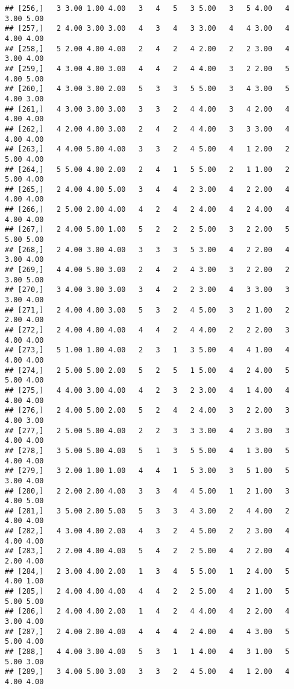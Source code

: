 \documentclass[]{article}
\begin{document}
\begin{verbatim}
## [256,]   3 3.00 1.00 4.00   3   4   5   3 5.00   3   5 4.00   4 3.00 5.00
## [257,]   2 4.00 3.00 3.00   4   3   4   3 3.00   4   4 3.00   4 4.00 4.00
## [258,]   5 2.00 4.00 4.00   2   4   2   4 2.00   2   2 3.00   4 3.00 4.00
## [259,]   4 3.00 4.00 3.00   4   4   2   4 4.00   3   2 2.00   5 4.00 5.00
## [260,]   4 3.00 3.00 2.00   5   3   3   5 5.00   3   4 3.00   5 4.00 3.00
## [261,]   4 3.00 3.00 3.00   3   3   2   4 4.00   3   4 2.00   4 4.00 4.00
## [262,]   4 2.00 4.00 3.00   2   4   2   4 4.00   3   3 3.00   4 4.00 4.00
## [263,]   4 4.00 5.00 4.00   3   3   2   4 5.00   4   1 2.00   2 5.00 4.00
## [264,]   5 5.00 4.00 2.00   2   4   1   5 5.00   2   1 1.00   2 5.00 4.00
## [265,]   2 4.00 4.00 5.00   3   4   4   2 3.00   4   2 2.00   4 4.00 4.00
## [266,]   2 5.00 2.00 4.00   4   2   4   2 4.00   4   2 4.00   4 4.00 4.00
## [267,]   2 4.00 5.00 1.00   5   2   2   2 5.00   3   2 2.00   5 5.00 5.00
## [268,]   2 4.00 3.00 4.00   3   3   3   5 3.00   4   2 2.00   4 3.00 4.00
## [269,]   4 4.00 5.00 3.00   2   4   2   4 3.00   3   2 2.00   2 3.00 5.00
## [270,]   3 4.00 3.00 3.00   3   4   2   2 3.00   4   3 3.00   3 3.00 4.00
## [271,]   2 4.00 4.00 3.00   5   3   2   4 5.00   3   2 1.00   2 2.00 4.00
## [272,]   2 4.00 4.00 4.00   4   4   2   4 4.00   2   2 2.00   3 4.00 4.00
## [273,]   5 1.00 1.00 4.00   2   3   1   3 5.00   4   4 1.00   4 4.00 4.00
## [274,]   2 5.00 5.00 2.00   5   2   5   1 5.00   4   2 4.00   5 5.00 4.00
## [275,]   4 4.00 3.00 4.00   4   2   3   2 3.00   4   1 4.00   4 4.00 4.00
## [276,]   2 4.00 5.00 2.00   5   2   4   2 4.00   3   2 2.00   3 4.00 3.00
## [277,]   2 5.00 5.00 4.00   2   2   3   3 3.00   4   2 3.00   3 4.00 4.00
## [278,]   3 5.00 5.00 4.00   5   1   3   5 5.00   4   1 3.00   5 4.00 4.00
## [279,]   3 2.00 1.00 1.00   4   4   1   5 3.00   3   5 1.00   5 3.00 4.00
## [280,]   2 2.00 2.00 4.00   3   3   4   4 5.00   1   2 1.00   3 4.00 5.00
## [281,]   3 5.00 2.00 5.00   5   3   3   4 3.00   2   4 4.00   2 4.00 4.00
## [282,]   4 3.00 4.00 2.00   4   3   2   4 5.00   2   2 3.00   4 4.00 4.00
## [283,]   2 2.00 4.00 4.00   5   4   2   2 5.00   4   2 2.00   4 2.00 4.00
## [284,]   2 3.00 4.00 2.00   1   3   4   5 5.00   1   2 4.00   5 4.00 1.00
## [285,]   2 4.00 4.00 4.00   4   4   2   2 5.00   4   2 1.00   5 5.00 5.00
## [286,]   2 4.00 4.00 2.00   1   4   2   4 4.00   4   2 2.00   4 3.00 4.00
## [287,]   2 4.00 2.00 4.00   4   4   4   2 4.00   4   4 3.00   5 5.00 4.00
## [288,]   4 4.00 3.00 4.00   5   3   1   1 4.00   4   3 1.00   5 5.00 3.00
## [289,]   3 4.00 5.00 3.00   3   3   2   4 5.00   4   1 2.00   4 4.00 4.00

\end{verbatim}
\end{document}
